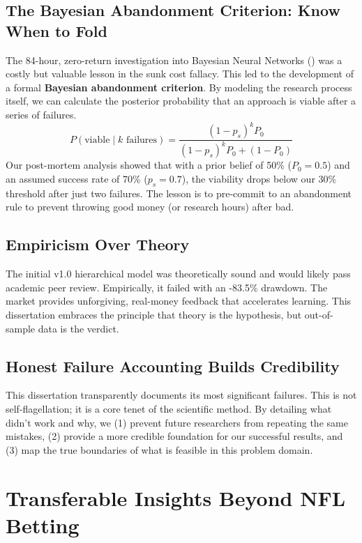 \subsection{The Bayesian Abandonment Criterion: Know When to Fold}

The 84-hour, zero-return investigation into Bayesian Neural Networks () was a costly but valuable lesson in the sunk cost fallacy. This led to the development of a formal \textbf{Bayesian abandonment criterion}. By modeling the research process itself, we can calculate the posterior probability that an approach is viable after a series of failures.
\begin{equation}
P(\text{viable} \mid k \text{ failures}) = \frac{(1 - p_s)^k P_0}{(1 - p_s)^k P_0 + (1 - P_0)}
\end{equation}
Our post-mortem analysis showed that with a prior belief of 50\% ($P_0=0.5$) and an assumed success rate of 70\% ($p_s=0.7$), the viability drops below our 30\% threshold after just two failures. The lesson is to pre-commit to an abandonment rule to prevent throwing good money (or research hours) after bad.

\subsection{Empiricism Over Theory}
The initial v1.0 hierarchical model was theoretically sound and would likely pass academic peer review. Empirically, it failed with an -83.5\% drawdown. The market provides unforgiving, real-money feedback that accelerates learning. This dissertation embraces the principle that theory is the hypothesis, but out-of-sample data is the verdict.

\subsection{Honest Failure Accounting Builds Credibility}
This dissertation transparently documents its most significant failures. This is not self-flagellation; it is a core tenet of the scientific method. By detailing what didn't work and why, we (1) prevent future researchers from repeating the same mistakes, (2) provide a more credible foundation for our successful results, and (3) map the true boundaries of what is feasible in this problem domain.

\section{Transferable Insights Beyond NFL Betting}
\label{sec:transferable-condensed}


